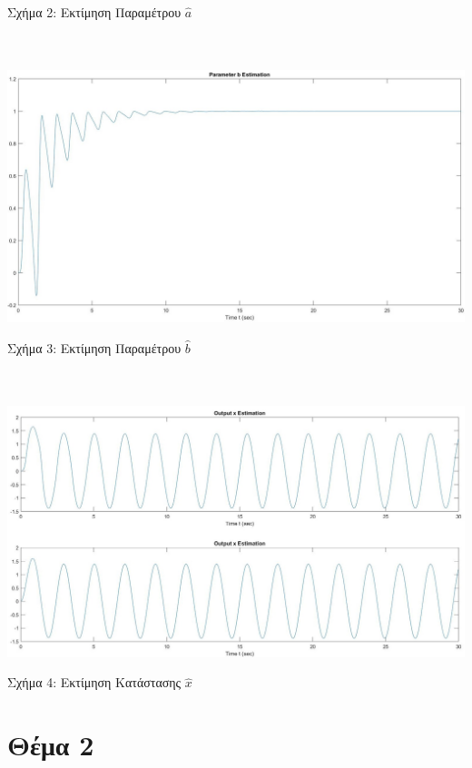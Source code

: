 \documentclass[12pt]{article}
\begin{document}
\centerline{Σχήμα 2: Εκτίμηση Παραμέτρου $\hat{a}$}
\\ \\
\includegraphics[width=\linewidth]{b_estim_1.jpg}
\centerline{Σχήμα 3: Εκτίμηση Παραμέτρου $\hat{b}$}
\\ \\
\includegraphics[width=\linewidth]{x_estim_1.jpg}
\centerline{Σχήμα 4: Εκτίμηση Κατάστασης $\hat{x}$}
\newpage
\section{Θέμα 2 }
\end{document}
